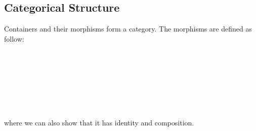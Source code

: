 \subsection{Categorical Structure}

Containers and their morphisms form a category. The morphisms are defined as follow:

\begin{code}%
\>[0]\AgdaSpace{}%
\AgdaSpace{}%
\AgdaSymbol{(}\AgdaSpace{}%
\AgdaSpace{}%
\AgdaSymbol{:}\AgdaSpace{}%
\AgdaSymbol{)}\AgdaSpace{}%
\AgdaSymbol{:}\AgdaSpace{}%
\AgdaSpace{}%
\<%
\\
\>[0][@{}l@{\AgdaIndent{0}}]%
\>[2]\AgdaSpace{}%
\<%
\\
%
\>[2]\AgdaSpace{}%
\AgdaSpace{}%
\<%
\\
%
\>[2]\AgdaSpace{}%
\AgdaSpace{}%
\AgdaSpace{}%
\AgdaSpace{}%
\AgdaSymbol{(}\AgdaSpace{}%
\AgdaSpace{}%
\AgdaSymbol{;}\AgdaSpace{}%
\AgdaSpace{}%
\AgdaSpace{}%
\AgdaSymbol{)}\<%
\\
%
\>[2]\<%
\\
\>[2][@{}l@{\AgdaIndent{0}}]%
\>[4]\AgdaSpace{}%
\AgdaSymbol{:}\AgdaSpace{}%
\AgdaSpace{}%
\AgdaSpace{}%
\<%
\\
%
\>[4]\AgdaSpace{}%
\AgdaSymbol{:}\AgdaSpace{}%
\AgdaSymbol{(}\AgdaSpace{}%
\AgdaSymbol{:}\AgdaSpace{}%
\AgdaSymbol{)}\AgdaSpace{}%
\AgdaSpace{}%
\AgdaSpace{}%
\AgdaSymbol{(}\AgdaSpace{}%
\AgdaSymbol{)}\AgdaSpace{}%
\AgdaSpace{}%
\AgdaSpace{}%
\<%
\end{code}

where we can also show that it has identity and composition.

